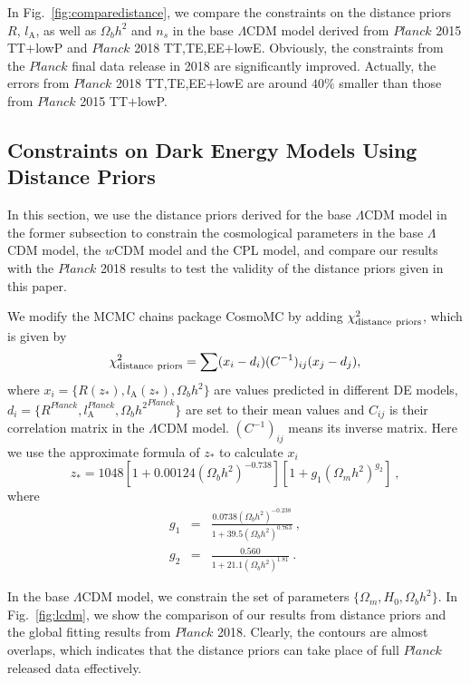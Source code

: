 \documentclass[floatfix,aps,amsmath,nofootinbib,onecolumn,10pt]{revtex4}
\def\e{\begin{equation}}
\def\q{\end{equation}}
\def\m{\begin{eqnarray}}
\def\n{\end{eqnarray}}
\begin{document}
In Fig.~\ref{fig:comparedistance}, we compare the constraints on the distance priors $R$, $l_\textrm{A}$, as well as $\Omega_b h^2$ and $n_s$ in the base $\Lambda$CDM model derived from $Planck$ 2015 TT$+$lowP and $Planck$ 2018 TT,TE,EE$+$lowE. Obviously, the constraints from the $Planck$ final data release in 2018 are significantly improved. Actually, the errors from $Planck$ 2018 TT,TE,EE$+$lowE are around $40\%$ smaller than those from $Planck$ 2015 TT$+$lowP.


\subsection{Constraints on Dark Energy Models Using Distance Priors}
\label{de}
   
In this section, we use the distance priors derived for the base $\Lambda$CDM model in the former subsection to constrain the cosmological parameters in the base $\Lambda$CDM model, the $w$CDM model and the CPL model, and compare our results with the $Planck$ 2018 results to test the validity of the distance priors given in this paper. 

We modify the MCMC chains package CosmoMC \cite{Lewis:2002ah} by adding $\chi^2_{\rm distance\ priors}$, which is given by
 \begin{align}\label{}
\chi^2_{\rm distance\ priors}=\sum(x_i-d_i)(C^{-1})_{ij}(x_j-d_j),
\end{align}
where $x_i=\{R(z_*), l_\textrm{A}(z_*), \Omega_b h^2\}$ are values predicted in different DE models, $d_i=\{R^{Planck}, l_\textrm{A}^{Planck}, {\Omega_b h^2} ^{Planck}\}$ are set to their mean values and $C_{ij}$ is their correlation matrix in the $\Lambda$CDM model. $(C^{-1})_{ij}$ means its inverse matrix.
Here we use the approximate formula of $z_*$ to calculate $x_i$ \cite{Hu:1995en}
\e
z_* = 1048[1+0.00124(\Omega_b h^2)^{-0.738}][1+g_1(\Omega_m h^2)^{g_2}]\ ,
\q
where
\m
g_1 &=& \frac{0.0738(\Omega_b h^2)^{-0.238}}{1+39.5(\Omega_b h^2)^{0.763}}\ ,\\
g_2 &=& \frac{0.560}{1+21.1(\Omega_b h^2)^{1.81}}\ .
\n

In the base $\Lambda$CDM model, we constrain the set of parameters $\{\Omega_m, H_0, \Omega_b h^2\}$. In Fig.~\ref{fig:lcdm}, we show the comparison of our results from distance priors and the global fitting results from $Planck$ 2018. Clearly, the contours are almost overlaps, which indicates that the distance priors can take place of full $Planck$ released data effectively.
\end{document}
